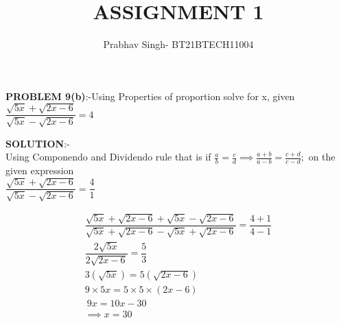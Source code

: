 \documentclass[journal,12pt,twocolumn]{IEEEtran}
\begin{document}
	\vspace{3cm}
	\title{ASSIGNMENT 1}
	\author{Prabhav Singh- BT21BTECH11004}
	
	\maketitle
	\textbf{PROBLEM 9(b)}:-Using Properties of proportion solve for x, given\\
	
	
	\hspace*{2cm}$ 	\dfrac{\sqrt{5x}+\sqrt{2x-6}}{\sqrt{5x}-\sqrt{2x-6}} =4 $
	
	
	\medskip
	
	
	\textbf{SOLUTION}:-\\
	Using Componendo and Dividendo rule that is if $  \frac{a}{b} =\frac{c}{d} \implies \frac{a+b}{a-b} =\frac{c+d}{c-d}; $ on the given expression\\
	
	 $	\dfrac{\sqrt{5x}+\sqrt{2x-6}}{\sqrt{5x}-\sqrt{2x-6}} =\dfrac{4}{1} $
	
	\begin{align}
		\dfrac{\sqrt{5x}+\sqrt{2x-6}+\sqrt{5x}-\sqrt{2x-6}}{\sqrt{5x}+\sqrt{2x-6}-\sqrt{5x}+\sqrt{2x-6}} =\dfrac{4+1}{4-1} \\ 
		\dfrac{2\sqrt{5x}}{2\sqrt{2x-6}} =\dfrac{5}{3} \\
		3(\sqrt{5x})=5(\sqrt{2x-6}) \\
		9\times5x=5\times5\times(2x-6) \\
		\ 9x=10x-30 \\
		\implies \boxed{ x=30} 
	\end{align}
	
	
	
\end{document}
